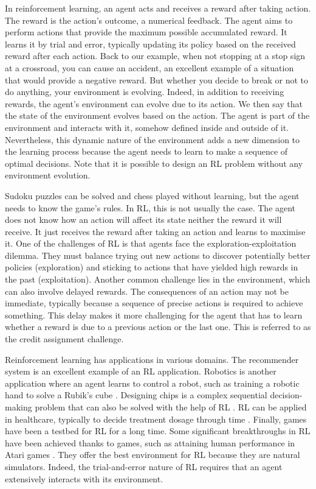 In reinforcement learning, an agent acts and receives a reward after taking action.
The reward is the action's outcome, a numerical feedback.
The agent aims to perform actions that provide the maximum possible accumulated reward.
It learns it by trial and error, typically updating its policy based on the received reward after each action.
Back to our example, when not stopping at a stop sign at a crossroad, you can cause an accident, an excellent example of a situation that would provide a negative reward.
But whether you decide to break or not to do anything, your environment is evolving.
Indeed, in addition to receiving rewards, the agent's environment can evolve due to its action.
We then say that the state of the environment evolves based on the action.
The agent is part of the environment and interacts with it, somehow defined inside and outside of it.
Nevertheless, this dynamic nature of the environment adds a new dimension to the learning process because the agent needs to learn to make a sequence of optimal decisions.
Note that it is possible to design an RL problem without any environment evolution.

Sudoku puzzles can be solved and chess played without learning, but the agent needs to know the game's rules.
In RL, this is not usually the case.
The agent does not know how an action will affect its state neither the reward it will receive.
It just receives the reward after taking an action and learns to maximise it.
One of the challenges of RL is that agents face the exploration-exploitation dilemma.
They must balance trying out new actions to discover potentially better policies (exploration) and sticking to actions that have yielded high rewards in the past (exploitation).
Another common challenge lies in the environment, which can also involve delayed rewards. 
The consequences of an action may not be immediate, typically because a sequence of precise actions is required to achieve something.
This delay makes it more challenging for the agent that has to learn whether a reward is due to a previous action or the last one.
This is referred to as the credit assignment challenge.

Reinforcement learning has applications in various domains.
The recommender system \citep{mcinerney2018explore} is an excellent example of an RL application.
Robotics is another application where an agent learns to control a robot, such as training a robotic hand to solve a Rubik's cube \citep{akkaya2019solving}.
Designing chips is a complex sequential decision-making problem that can also be solved with the help of RL \citep{mirhoseini2021graph}. 
RL can be applied in healthcare, typically to decide treatment dosage through time \citep{miotto2018deep}.
Finally, games have been a testbed for RL for a long time.
Some significant breakthroughs in RL have been achieved thanks to games, such as attaining human performance in Atari games \citep{Mnih2015}.
They offer the best environment for RL because they are natural simulators.
Indeed, the trial-and-error nature of RL requires that an agent extensively interacts with its environment.


